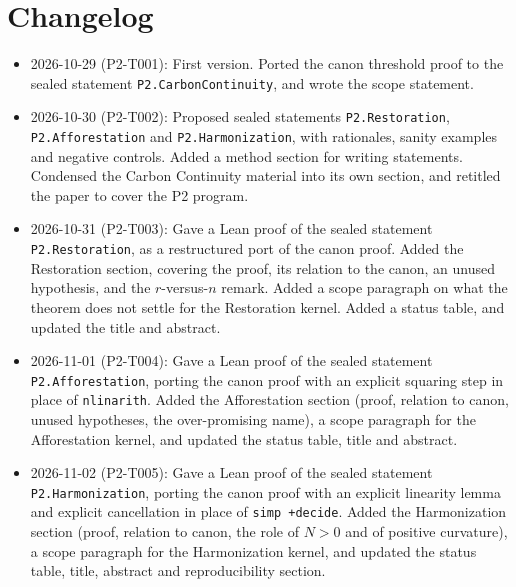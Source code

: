 \documentclass[11pt]{article}
\theoremstyle{definition}
\theoremstyle{remark}
\begin{document}
\section{Changelog}
\begin{itemize}
\item 2026-10-29 (P2-T001): First version. Ported the canon threshold proof to the sealed statement
\texttt{P2.CarbonContinuity}, and wrote the scope statement.
\item 2026-10-30 (P2-T002): Proposed sealed statements \texttt{P2.Restoration}, \texttt{P2.Afforestation} and \texttt{P2.Harmonization},
with rationales, sanity examples and negative controls. Added a method section for writing statements.
Condensed the Carbon Continuity material into its own section, and retitled the paper to cover the P2 program.
\item 2026-10-31 (P2-T003): Gave a Lean proof of the sealed statement \texttt{P2.Restoration}, as a restructured port of the canon
proof. Added the Restoration section, covering the proof, its relation to the canon, an unused hypothesis, and the $r$-versus-$n$ remark.
Added a scope paragraph on what the theorem does not settle for the Restoration kernel. Added a status table, and updated the title and abstract.
\item 2026-11-01 (P2-T004): Gave a Lean proof of the sealed statement \texttt{P2.Afforestation}, porting the canon proof with
an explicit squaring step in place of \texttt{nlinarith}. Added the Afforestation section (proof, relation to canon, unused hypotheses,
the over-promising name), a scope paragraph for the Afforestation kernel, and updated the status table, title and abstract.
\item 2026-11-02 (P2-T005): Gave a Lean proof of the sealed statement \texttt{P2.Harmonization}, porting the canon proof with an
explicit linearity lemma and explicit cancellation in place of \texttt{simp +decide}. Added the Harmonization section (proof,
relation to canon, the role of $N>0$ and of positive curvature), a scope paragraph for the Harmonization kernel, and updated the
status table, title, abstract and reproducibility section.
\end{itemize}



\end{document}
